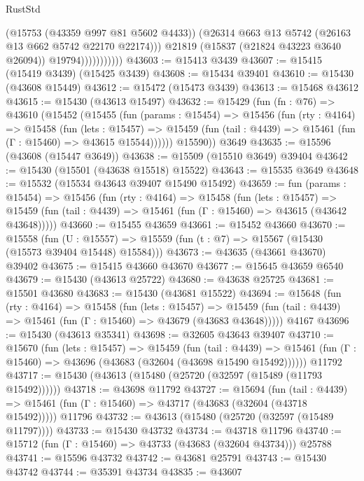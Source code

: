 \begin{lexlean}{RustStd}
\begin{coremodule}
{\begin{coremodule}
{{{{{{{{{{{{{{{{{{{{{{{{{{{{{{{{{{{{{{{{{{{{{{{{{{{{{{{{{{{{                            (@15753 (@43359 @997 @81 @5602 @4433))
                            (@26314 @663 @13 @5742 (@26163 @13 @662 @5742 @22170 @22174)))
                          @21819
                          (@15837 (@21824 @43223 @3640 @26094))
                          @19794)))))))))))
@43603 := @15413 @3439
@43607 := @15415 (@15419 @3439) (@15425 @3439)
@43608 := @15434 @39401
@43610 := @15430 (@43608 @15449)
@43612 := @15472 (@15473 @3439)
@43613 := @15468 @43612
@43615 := @15430 (@43613 @15497)
@43632 := @15429
    (fun (fn : @76) =>
    @43610
      (@15452
        (@15455
          (fun (params : @15454) =>
          @15456
            (fun (rty : @4164) =>
            @15458
              (fun (lets : @15457) =>
              @15459 (fun (tail : @4439) => @15461 (fun (Γ : @15460) => @43615 @15544))))))
        @15590))
    @3649
@43635 := @15596 (@43608 (@15447 @3649))
@43638 := @15509 (@15510 @3649) @39404
@43642 := @15430 (@15501 (@43638 @15518) @15522)
@43643 := @15535 @3649
@43648 := @15532 (@15534 @43643 @39407 @15490 @15492)
@43659 := fun (params : @15454) =>
  @15456
    (fun (rty : @4164) =>
    @15458
      (fun (lets : @15457) =>
      @15459 (fun (tail : @4439) => @15461 (fun (Γ : @15460) => @43615 (@43642 @43648)))))
@43660 := @15455 @43659
@43661 := @15452 @43660
@43670 := @15558
    (fun (U : @15557) => @15559 (fun (t : @7) => @15567 (@15430 (@15573 @39404 @15448) @15584)))
@43673 := @43635 (@43661 @43670) @39402
@43675 := @15415 @43660 @43670
@43677 := @15645 @43659 @6540
@43679 := @15430 (@43613 @25722)
@43680 := @43638 @25725
@43681 := @15501 @43680
@43683 := @15430 (@43681 @15522)
@43694 := @15648
    (fun (rty : @4164) =>
    @15458
      (fun (lets : @15457) =>
      @15459 (fun (tail : @4439) => @15461 (fun (Γ : @15460) => @43679 (@43683 @43648)))))
    @4167
@43696 := @15430 (@43613 @35341)
@43698 := @32605 @43643 @39407
@43710 := @15670
    (fun (lets : @15457) =>
    @15459
      (fun (tail : @4439) =>
      @15461 (fun (Γ : @15460) => @43696 (@43683 (@32604 (@43698 @15490 @15492))))))
    @11792
@43717 := @15430 (@43613 (@15480 (@25720 (@32597 (@15489 (@11793 @15492))))))
@43718 := @43698 @11792
@43727 := @15694
    (fun (tail : @4439) => @15461 (fun (Γ : @15460) => @43717 (@43683 (@32604 (@43718 @15492)))))
    @11796
@43732 := @43613 (@15480 (@25720 (@32597 (@15489 @11797))))
@43733 := @15430 @43732
@43734 := @43718 @11796
@43740 := @15712 (fun (Γ : @15460) => @43733 (@43683 (@32604 @43734))) @25788
@43741 := @15596 @43732
@43742 := @43681 @25791
@43743 := @15430 @43742
@43744 := @35391 @43734
@43835 := @43607
}}}}}}}}}}}}}}}}}}}}}}}}}}}}}}}}}}}}}}}}}}}}}}}}}}}}}}}}}}}}
\end{coremodule}}
\end{coremodule}
\end{lexlean}
